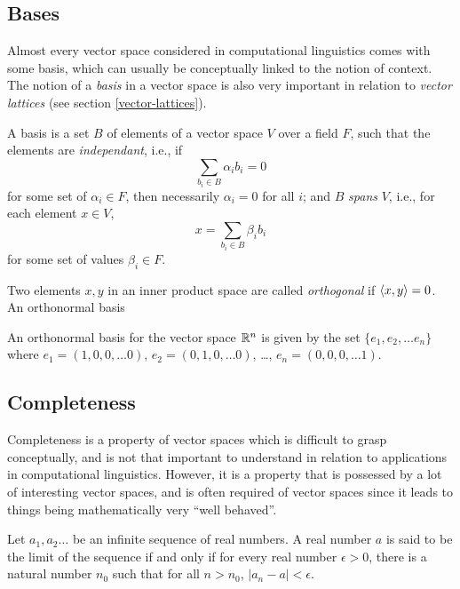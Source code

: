 \documentclass[12pt]{report}
\begin{document}
\subsection{Bases}

Almost every vector space considered in computational linguistics comes with some basis, which can usually be conceptually linked to the notion of context. The notion of a \emph{basis} in a vector space is also very important in relation to \emph{vector lattices} (see section \ref{vector-lattices}).

\begin{defn}[Basis]
A basis is a set $B$ of elements of a vector space $V$ over a field $F$, such that the elements are \emph{independant}, i.e., if
$$\sum_{b_i \in B} \alpha_i b_i = 0$$
for some set of $\alpha_i \in F$, then necessarily $\alpha_i = 0$ for all $i$; and $B$ \emph{spans} $V$, i.e., for each element $x \in V$,
$$x = \sum_{b_i \in B} \beta_i b_i$$
for some set of values $\beta_i \in F$.

Two elements $x,y$ in an inner product space are called \emph{orthogonal} if $\langle x, y \rangle = 0$. An orthonormal basis
\end{defn}

\begin{example}
An orthonormal basis for the vector space $\mathbb{R}^n$ is given by the set $\{e_1,e_2,\ldots e_n\}$ where $e_1 = (1,0,0,\dots 0)$, $e_2 = (0,1,0,\dots 0)$, \ldots, $e_n = (0,0,0,\dots 1)$.
\end{example}

\subsection{Completeness}

Completeness is a property of vector spaces which is difficult to grasp conceptually, and is not that important to understand in relation to applications in computational linguistics. However, it is a property that is possessed by a lot of interesting vector spaces, and is often required of vector spaces since it leads to things being mathematically very ``well behaved''.

\begin{defn}[Limit]
Let $a_1,a_2\ldots$ be an infinite sequence of real numbers. A real number $a$ is said to be the limit of the sequence if and only if for every real number $\epsilon > 0$, there is a natural number $n_0$ such that for all $n > n_0$, $|a_n - a| < \epsilon$.
\end{defn}
\end{document}
